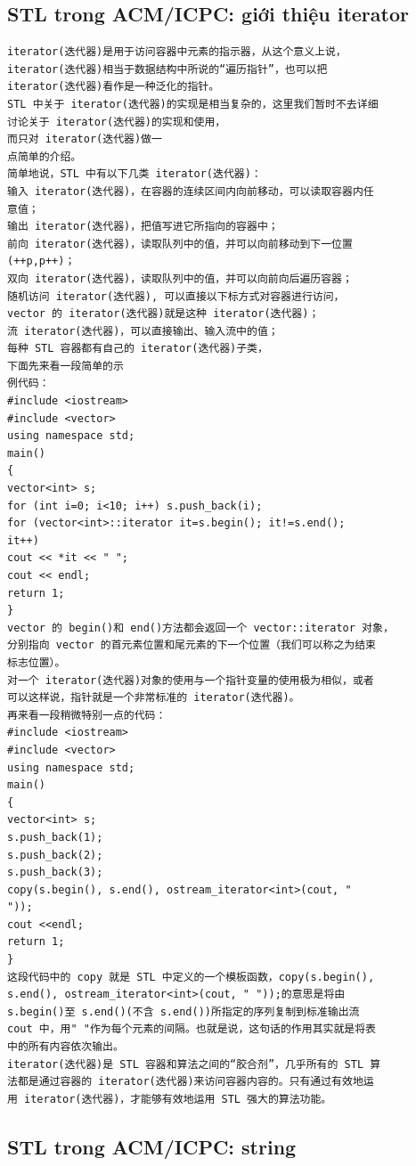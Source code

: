 \documentclass[11pt]{article}
\begin{document}
\subsection{STL trong ACM/ICPC: giới thiệu iterator}

\begingroup
\scriptsize
\begin{verbatim}
iterator(迭代器)是用于访问容器中元素的指示器，从这个意义上说，
iterator(迭代器)相当于数据结构中所说的“遍历指针”，也可以把
iterator(迭代器)看作是一种泛化的指针。
STL 中关于 iterator(迭代器)的实现是相当复杂的，这里我们暂时不去详细
讨论关于 iterator(迭代器)的实现和使用，
而只对 iterator(迭代器)做一
点简单的介绍。
简单地说，STL 中有以下几类 iterator(迭代器)：
输入 iterator(迭代器)，在容器的连续区间内向前移动，可以读取容器内任
意值；
输出 iterator(迭代器)，把值写进它所指向的容器中；
前向 iterator(迭代器)，读取队列中的值，并可以向前移动到下一位置
(++p,p++)；
双向 iterator(迭代器)，读取队列中的值，并可以向前向后遍历容器；
随机访问 iterator(迭代器), 可以直接以下标方式对容器进行访问，
vector 的 iterator(迭代器)就是这种 iterator(迭代器)；
流 iterator(迭代器)，可以直接输出、输入流中的值；
每种 STL 容器都有自己的 iterator(迭代器)子类，
下面先来看一段简单的示
例代码：
#include <iostream>
#include <vector>
using namespace std;
main()
{
vector<int> s;
for (int i=0; i<10; i++) s.push_back(i);
for (vector<int>::iterator it=s.begin(); it!=s.end();
it++)
cout << *it << " ";
cout << endl;
return 1;
}
vector 的 begin()和 end()方法都会返回一个 vector::iterator 对象，
分别指向 vector 的首元素位置和尾元素的下一个位置（我们可以称之为结束
标志位置）。
对一个 iterator(迭代器)对象的使用与一个指针变量的使用极为相似，或者
可以这样说，指针就是一个非常标准的 iterator(迭代器)。
再来看一段稍微特别一点的代码：
#include <iostream>
#include <vector>
using namespace std;
main()
{
vector<int> s;
s.push_back(1);
s.push_back(2);
s.push_back(3);
copy(s.begin(), s.end(), ostream_iterator<int>(cout, "
"));
cout <<endl;
return 1;
}
这段代码中的 copy 就是 STL 中定义的一个模板函数，copy(s.begin(),
s.end(), ostream_iterator<int>(cout, " "));的意思是将由
s.begin()至 s.end()(不含 s.end())所指定的序列复制到标准输出流
cout 中，用" "作为每个元素的间隔。也就是说，这句话的作用其实就是将表
中的所有内容依次输出。
iterator(迭代器)是 STL 容器和算法之间的“胶合剂”，几乎所有的 STL 算
法都是通过容器的 iterator(迭代器)来访问容器内容的。只有通过有效地运
用 iterator(迭代器)，才能够有效地运用 STL 强大的算法功能。
\end{verbatim}
\endgroup

\subsection{STL trong ACM/ICPC: string}
\end{document}
